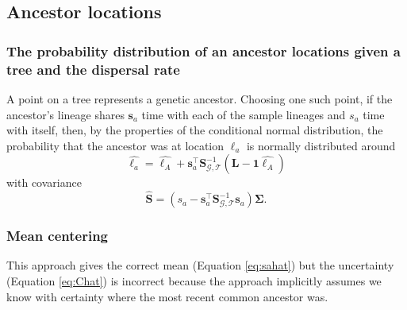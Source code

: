 \documentclass[12pt]{article}
\begin{document}
\subsection*{Ancestor locations}

\subsubsection*{The probability distribution of an ancestor locations given a tree and the dispersal rate}

A point on a tree represents a genetic ancestor.
Choosing one such point, if the ancestor's lineage shares $\mathbf{s}_a$ time with each of the sample lineages and $s_a$ time with itself, then, by the properties of the conditional normal distribution, the probability that the ancestor was at location $\bm{\ell}_a$ is normally distributed
around
%
\begin{equation}\label{eq:sahat}
\widehat{\bm{\ell}_a} = \widehat{\bm{\ell}_A} + \mathbf{s}_a^\intercal \mathbf{S}_{\mathcal{G},\mathcal{T}}^{-1} (\mathbf{L} - \mathbf{1}\widehat{\bm{\ell}_A})
\end{equation}
%
with covariance
%
\begin{equation}\label{eq:Chat}
\widehat{\mathbf{S}} = (s_a - \mathbf{s}_a^\intercal \mathbf{S}_{\mathcal{G},\mathcal{T}}^{-1} \mathbf{s}_a)\mathbf{\Sigma}.
\end{equation}
%

\subsubsection*{Mean centering}

This approach gives the correct mean (Equation \eqref{eq:sahat}) but the uncertainty (Equation \eqref{eq:Chat}) is incorrect because the approach implicitly assumes we know with certainty where the most recent common ancestor was.
\end{document}
